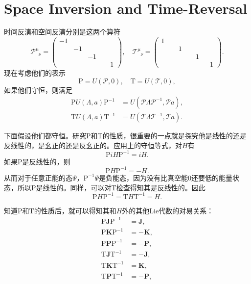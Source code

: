 \documentclass[9pt]{extbook}
\begin{document}
\section{Space Inversion and Time-Reversal}
时间反演和空间反演分别是这两个算符
\[
\mathscr{P}^\mu_{\phantom{\mu}\nu}=\begin{pmatrix}-1&&&\\&-1&&\\&&-1&\\&&&\phantom{-}1 \end{pmatrix},
\quad \mathscr{T}^\mu_{\phantom{\mu}\nu}=\begin{pmatrix}1&&&\\&\phantom{-}1&&\\&&\phantom{-}1&\\&&&-1 \end{pmatrix}.
\]
现在考虑他们的表示
\[
\mathrm{P}=U(\mathscr{P},0),\quad \mathrm{T}=U(\mathscr{T},0),
\]
如果他们守恒，则满足
\[
\begin{split}
\mathrm{P}U(\Lambda,a)\mathrm{P}^{-1}&=U(\mathscr{P}\Lambda\mathscr{P}^{-1},\mathscr{P}a),\\
\mathrm{T}U(\Lambda,a)\mathrm{T}^{-1}&=U(\mathscr{T}\Lambda\mathscr{T}^{-1},\mathscr{T}a).
\end{split}
\]

下面假设他们都守恒。研究$\mathrm{P}$和$\mathrm{T}$的性质，很重要的一点就是探究他是线性的还是反线性的，是幺正的还是反幺正的。应用上的守恒等式，对$H$有
\[
\mathrm{P}iH\mathrm{P}^{-1}=iH.
\]
如果$\mathrm{P}$是反线性的，则
\[
\mathrm{P}H\mathrm{P}^{-1}=-H.
\]
从而对于任意正能的态$\Psi$，$\mathrm{P}^{-1}\Psi$是负能态，因为没有比真空能0还要低的能量状态，所以$\mathrm{P}$是线性的。同样，可以对$\mathrm{T}$检查得知其是反线性的。因此
\[
\mathrm{P}H\mathrm{P}^{-1}=\mathrm{T}H\mathrm{T}^{-1}=H.
\]

知道$\mathrm{P}$和$\mathrm{T}$的性质后，就可以得知其和$H$外的其他Lie代数的对易关系：
\[
\begin{split}
\mathrm{P}\bm{J}\mathrm{P}^{-1}&=\bm{J},\\
\mathrm{P}\bm{K}\mathrm{P}^{-1}&=-\bm{K},\\
\mathrm{P}\bm{P}\mathrm{P}^{-1}&=-\bm{P},\\
\mathrm{T}\bm{J}\mathrm{T}^{-1}&=-\bm{J},\\
\mathrm{T}\bm{K}\mathrm{T}^{-1}&=\bm{K},\\
\mathrm{T}\bm{P}\mathrm{T}^{-1}&=-\bm{P},\\
\end{split}
\]
\end{document}
